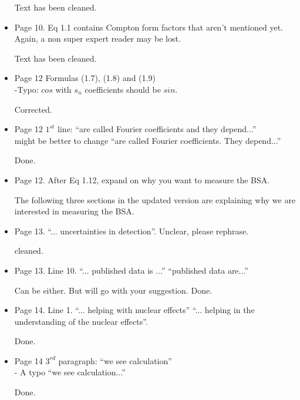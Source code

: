 \begin{itemize}
       {\color{red} Text has been cleaned.}
  
  \item Page 10. Eq 1.1 contains Compton form factors that aren't mentioned 
     yet. Again, a non super expert reader may be lost.
     
       {\color{red} Text has been cleaned.}
  
  
  \item Page 12 Formulas (1.7), (1.8) and (1.9) \\
  -Typo: $cos$ with $s_{n}$ coefficients should be $sin$.
  
     {\color{red} Corrected.}
  
  \item Page 12 $1^{st}$ line:  ``are called Fourier coefficients and they 
     depend...'' \\
  might be better to change ``are called Fourier coefficients. They depend...''
     
       {\color{red} Done.}
  
  \item Page 12. After Eq 1.12, expand on why you want to measure the BSA.
       
     {\color{red} The following three sections in the updated version are 
       explaining why we are interested in measuring the BSA.}
  
  \item Page 13. ``... uncertainties in detection''. Unclear, please rephrase.
     
     {\color{red} cleaned.}
  
  \item Page 13. Line 10. ``... published data is ...'' \rarr ``published data are...''
     
     {\color{red} Can be either. But will go with your suggestion. Done.}
  
  \item Page 14. Line 1. ``... helping with nuclear effects'' \rarr ``...  
     helping in the understanding of the nuclear effects''.
     
       {\color{red} Done.}
  
  \item Page 14 $3^{rd}$ paragraph: ``we see calculation''\\
  - A typo ``we see calculation...''
     
     {\color{red} Done.}
  

\end{itemize}
